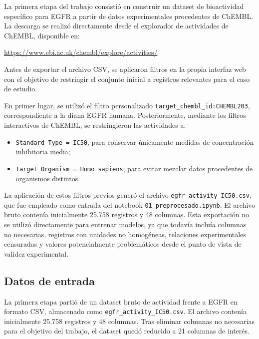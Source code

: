 \documentclass[IB]{TFUOC}%
\begin{document}
La primera etapa del trabajo consistió en construir un dataset de bioactividad específico para EGFR a partir de datos experimentales procedentes de ChEMBL. La descarga se realizó directamente desde el explorador de actividades de ChEMBL, disponible en:

\vspace{0.1cm}
\begin{center}
\url{https://www.ebi.ac.uk/chembl/explore/activities/}
\end{center}
\vspace{0.1cm}

Antes de exportar el archivo CSV, se aplicaron filtros en la propia interfaz web con el objetivo de restringir el conjunto inicial a registros relevantes para el caso de estudio.

En primer lugar, se utilizó el filtro personalizado \texttt{target\_chembl\_id:CHEMBL203}, correspondiente a la diana EGFR humana. Posteriormente, mediante los filtros interactivos de ChEMBL, se restringieron las actividades a:

\begin{itemize}
    \item \texttt{Standard Type = IC50}, para conservar únicamente medidas de concentración inhibitoria media;
    \item \texttt{Target Organism = Homo sapiens}, para evitar mezclar datos procedentes de organismos distintos.
\end{itemize}

La aplicación de estos filtros previos generó el archivo \texttt{egfr\_activity\_IC50.csv}, que fue empleado como entrada del notebook \texttt{01\_preprocesado.ipynb}. El archivo bruto contenía inicialmente 25.758 registros y 48 columnas. Esta exportación no se utilizó directamente para entrenar modelos, ya que todavía incluía columnas no necesarias, registros con unidades no homogéneas, relaciones experimentales censuradas y valores potencialmente problemáticos desde el punto de vista de validez experimental.

\subsection{Datos de entrada}

La primera etapa partió de un dataset bruto de actividad frente a EGFR en formato CSV, almacenado como \texttt{egfr\_activity\_IC50.csv}. El archivo contenía inicialmente 25.758 registros y 48 columnas. Tras eliminar columnas no necesarias para el objetivo del trabajo, el dataset quedó reducido a 21 columnas de interés.
\end{document}
